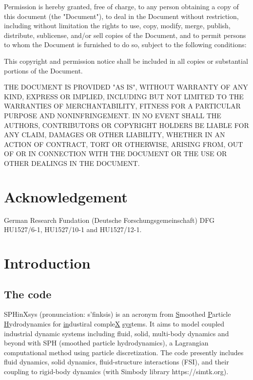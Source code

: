 \documentclass[12pt, a4paper,onecolumn]{article}
\begin{document}
\footnotesize{\noindent  Permission is hereby granted, free of charge, to any person obtaining a copy of this document (the "Document"), to deal in the Document without restriction, including without limitation the rights to use, copy, modify, merge, publish, distribute, sublicense, and/or sell copies of the Document, and to permit persons to whom the Document is furnished to do so, subject to the following conditions:

This copyright and permission notice shall be included in all copies or substantial portions of the Document.

THE DOCUMENT IS PROVIDED "AS IS", WITHOUT WARRANTY OF ANY KIND, EXPRESS OR IMPLIED, INCLUDING BUT NOT LIMITED TO THE WARRANTIES OF MERCHANTABILITY, FITNESS FOR A PARTICULAR PURPOSE AND NONINFRINGEMENT. IN NO EVENT SHALL THE AUTHORS, CONTRIBUTORS OR COPYRIGHT HOLDERS BE LIABLE FOR ANY CLAIM, DAMAGES OR OTHER LIABILITY, WHETHER IN AN ACTION OF CONTRACT, TORT OR OTHERWISE, ARISING FROM, OUT OF OR IN CONNECTION WITH THE DOCUMENT OR THE USE OR OTHER DEALINGS IN THE DOCUMENT.}
\clearpage

\newpage
\section*{Acknowledgement}
German Research Fundation (Deutsche Forschungsgemeinschaft) DFG HU1527/6-1, HU1527/10-1 and HU1527/12-1.

\newpage
\tableofcontents
%
\newpage
\section{Introduction}
\subsection{The code}
SPHinXsys (pronunciation: s'finksis) is an acronym from 
\underline{S}moothed \underline{P}article \underline{H}ydrodynamics 
for \underline{in}dustiral comple\underline{X} \underline{sys}tems.
It aims to model coupled industrial dynamic systems including fluid, 
solid, multi-body dynamics and beyond with SPH (smoothed particle hydrodynamics), 
a Lagrangian computational method using particle discretization.
The code presently includes fluid dynamics, solid dynamics, fluid-structure interactions (FSI), 
and their coupling to rigid-body dynamics (with Simbody library https://simtk.org).
\end{document}
